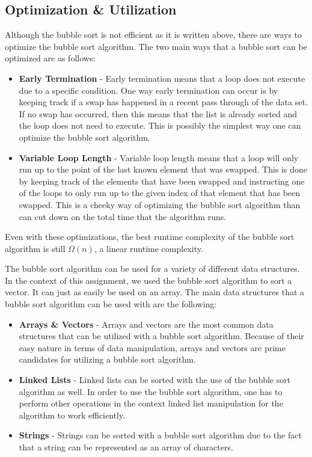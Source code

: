 \documentclass[a4paper,9pt]{article}
\begin{document}
\subsection*{Optimization \& Utilization}

Although the bubble sort is not efficient as it is written above, there are ways to optimize the bubble sort algorithm. The two main ways that a bubble sort can be optimized are as follows:

\begin{itemize}
    \item \textbf{Early Termination} - Early termination means that a loop does not execute due to a specific condition. One way early termination can occur is by keeping track if a swap has happened in a recent pass through of the data set. If no swap has occurred, then this means that the list is already sorted and the loop does not need to execute. 
    This is possibly the simplest way one can optimize the bubble sort algorithm.
    \item \textbf{Variable Loop Length} - Variable loop length means that a loop will only run up to the point of the last known element that was swapped. This is done by keeping track of the elements that have been swapped and instructing one of the loops to only run up to the given index of that element that has been swapped. This is a cheeky way of 
    optimizing the bubble sort algorithm than can cut down on the total time that the algorithm runs.
\end{itemize}

\noindent Even with these optimizations, the best runtime complexity of the bubble sort algorithm is still $\Omega(n)$, a linear runtime complexity.

The bubble sort algorithm can be used for a variety of different data structures. In the context of this assignment, we used the bubble sort algorithm to sort a vector. It can just as easily be used on an array. The main data structures that a bubble sort algorithm can be used with are the following:

\begin{itemize}
    \item \textbf{Arrays \& Vectors} - Arrays and vectors are the most common data structures that can be utilized with a bubble sort algorithm. Because of their easy nature in terms of data manipulation, arrays and vectors are prime candidates for utilizing a bubble sort algorithm.
    \item \textbf{Linked Lists} - Linked lists can be sorted with the use of the bubble sort algorithm as well. In order to use the bubble sort algorithm, one has to perform other operations in the context linked list manipulation for the algorithm to work efficiently.
    \item \textbf{Strings} - Strings can be sorted with a bubble sort algorithm due to the fact that a string can be represented
    as an array of characters. 
\end{itemize}
\end{document}
